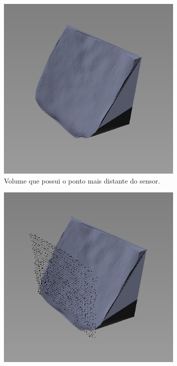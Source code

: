 \begin{figure}[H]
    \centering
    \begin{subfigure}[t]{0.325\textwidth}
        \includegraphics[width=\textwidth]{dados/figuras/projection1.png}
        \caption{Volume que possui o ponto mais distante do sensor.}
        \label{fig:projection1}
    \end{subfigure}
    \begin{subfigure}[t]{0.325\textwidth}
        \includegraphics[width=\textwidth]{dados/figuras/projection2.png}

\end{subfigure}
\end{figure}
